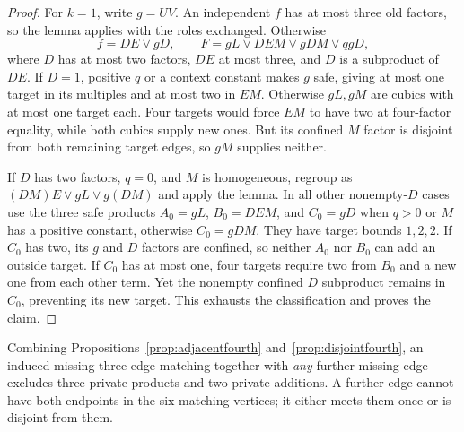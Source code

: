 \documentclass[11pt]{article}
\theoremstyle{definition}
\theoremstyle{remark}
\begin{document}
\begin{proof}
For $k=1$, write $g=UV$. An independent $f$ has at most three old factors, so the lemma applies with the roles exchanged. Otherwise
\[
 f=DE\vee gD,\qquad F=gL\vee DEM\vee gDM\vee qgD,
\]
where $D$ has at most two factors, $DE$ at most three, and $D$ is a subproduct of $DE$. If $D=1$, positive $q$ or a context constant makes $g$ safe, giving at most one target in its multiples and at most two in $EM$. Otherwise $gL,gM$ are cubics with at most one target each. Four targets would force $EM$ to have two at four-factor equality, while both cubics supply new ones. But its confined $M$ factor is disjoint from both remaining target edges, so $gM$ supplies neither.

If $D$ has two factors, $q=0$, and $M$ is homogeneous, regroup as $(DM)E\vee gL\vee g(DM)$ and apply the lemma. In all other nonempty-$D$ cases use the three safe products $A_0=gL$, $B_0=DEM$, and $C_0=gD$ when $q>0$ or $M$ has a positive constant, otherwise $C_0=gDM$. They have target bounds $1,2,2$. If $C_0$ has two, its $g$ and $D$ factors are confined, so neither $A_0$ nor $B_0$ can add an outside target. If $C_0$ has at most one, four targets require two from $B_0$ and a new one from each other term. Yet the nonempty confined $D$ subproduct remains in $C_0$, preventing its new target. This exhausts the classification and proves the claim.
\end{proof}

Combining Propositions~\ref{prop:adjacentfourth} and~\ref{prop:disjointfourth}, an induced missing three-edge matching together with \emph{any} further missing edge excludes three private products and two private additions. A further edge cannot have both endpoints in the six matching vertices; it either meets them once or is disjoint from them.
\end{document}

